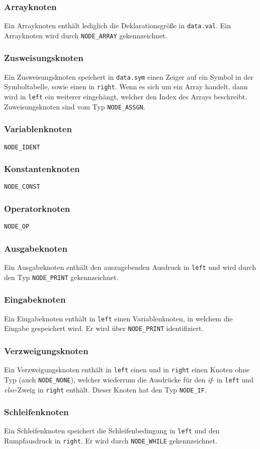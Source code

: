 \subsubsection{Arrayknoten}
Ein Arrayknoten enthält lediglich die Deklarationsgröße in \texttt{data.val}.
Ein Arrayknoten wird durch \texttt{NODE_ARRAY} gekennzeichnet.

\subsubsection{Zusweisungsknoten}
Ein Zusweisungsknoten speichert in \texttt{data.sym} einen Zeiger auf ein Symbol in der Symboltabelle,
sowie einen 
in \texttt{right}.
Wenn es sich um ein Array handelt,
dann wird in \texttt{left} ein weiterer
eingehängt,
welcher den Index des Arrays beschreibt.
Zuweisungsknoten sind vom Typ \texttt{NODE_ASSGN}.

\subsubsection{Variablenknoten}
\texttt{NODE_IDENT}

\subsubsection{Konstantenknoten}
\texttt{NODE_CONST}

\subsubsection{Operatorknoten}
\texttt{NODE_OP}

\subsubsection{Ausgabeknoten}
Ein Ausgabeknoten enthält den auszugebenden Ausdruck in \texttt{left}
und wird durch den Typ \texttt{NODE_PRINT} gekennzeichnet.

\subsubsection{Eingabeknoten}
Ein Eingabeknoten enthält in \texttt{left} einen Variablenknoten,
in welchem die Eingabe gespeichert wird.
Er wird über \texttt{NODE_PRINT} identifiziert.

\subsubsection{Verzweigungsknoten}
Ein Verzweigungsknoten enthält in \texttt{left} einen
und in \texttt{right} einen Knoten ohne Typ (auch \texttt{NODE_NONE}),
welcher wiederrum die Ausdrücke für den \emph{if}- in \texttt{left}
und \emph{else}-Zweig in \texttt{right} enthält.
Dieser Knoten hat den Typ \texttt{NODE_IF}.

\subsubsection{Schleifenknoten}
Ein Schleifenknoten speichert die Schleifenbedingung in \texttt{left}
und den Rumpfausdruck in \texttt{right}.
Er wird durch \texttt{NODE_WHILE} gekennzeichnet.
